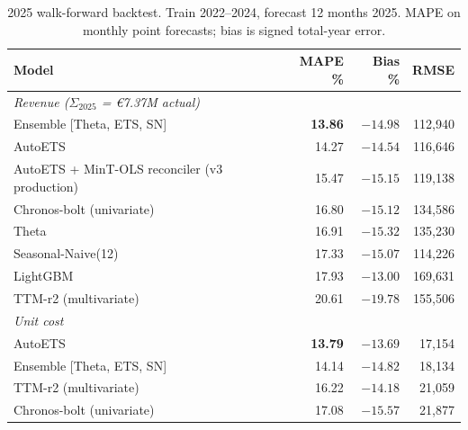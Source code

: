 \documentclass[11pt,a4paper]{article}
\begin{document}
\begin{table}[ht]
\centering
\small
\caption{2025 walk-forward backtest. Train 2022--2024, forecast 12 months 2025. MAPE on monthly point forecasts; bias is signed total-year error.}
\label{tab:forecast2025}
\begin{tabular}{@{}lrrr@{}}
\toprule
\textbf{Model} & \textbf{MAPE \%} & \textbf{Bias \%} & \textbf{RMSE} \\
\midrule
\multicolumn{4}{l}{\textit{Revenue ($\Sigma_{2025}$ = €7.37M actual)}} \\
Ensemble [Theta, ETS, SN]                       & \textbf{13.86} & $-14.98$ & 112{,}940 \\
AutoETS                                          & 14.27 & $-14.54$ & 116{,}646 \\
AutoETS + MinT-OLS reconciler (v3 production)    & 15.47 & $-15.15$ & 119{,}138 \\
Chronos-bolt (univariate)                        & 16.80 & $-15.12$ & 134{,}586 \\
Theta                                            & 16.91 & $-15.32$ & 135{,}230 \\
Seasonal-Naive(12)                               & 17.33 & $-15.07$ & 114{,}226 \\
LightGBM                                         & 17.93 & $-13.00$ & 169{,}631 \\
TTM-r2 (multivariate)                            & 20.61 & $-19.78$ & 155{,}506 \\
\midrule
\multicolumn{4}{l}{\textit{Unit cost}} \\
AutoETS                                          & \textbf{13.79} & $-13.69$ & 17{,}154 \\
Ensemble [Theta, ETS, SN]                        & 14.14 & $-14.82$ & 18{,}134 \\
TTM-r2 (multivariate)                            & 16.22 & $-14.18$ & 21{,}059 \\
Chronos-bolt (univariate)                        & 17.08 & $-15.57$ & 21{,}877 \\
\bottomrule
\end{tabular}
\end{table}
\end{document}
